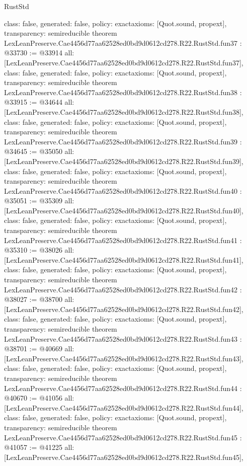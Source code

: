 \begin{lexlean}{RustStd}
\begin{coremodule}
{  class: false,
  generated: false,
  policy: exact{axioms: [Quot.sound, propext]},
  transparency: semireducible
}
theorem LexLeanPreserve.Cae4456d77aa62528ed0bd9d0612cd278.R22.RustStd.fun37 : @33730 := @33914 {
  all: [LexLeanPreserve.Cae4456d77aa62528ed0bd9d0612cd278.R22.RustStd.fun37],
  class: false,
  generated: false,
  policy: exact{axioms: [Quot.sound, propext]},
  transparency: semireducible
}
theorem LexLeanPreserve.Cae4456d77aa62528ed0bd9d0612cd278.R22.RustStd.fun38 : @33915 := @34644 {
  all: [LexLeanPreserve.Cae4456d77aa62528ed0bd9d0612cd278.R22.RustStd.fun38],
  class: false,
  generated: false,
  policy: exact{axioms: [Quot.sound, propext]},
  transparency: semireducible
}
theorem LexLeanPreserve.Cae4456d77aa62528ed0bd9d0612cd278.R22.RustStd.fun39 : @34645 := @35050 {
  all: [LexLeanPreserve.Cae4456d77aa62528ed0bd9d0612cd278.R22.RustStd.fun39],
  class: false,
  generated: false,
  policy: exact{axioms: [Quot.sound, propext]},
  transparency: semireducible
}
theorem LexLeanPreserve.Cae4456d77aa62528ed0bd9d0612cd278.R22.RustStd.fun40 : @35051 := @35309 {
  all: [LexLeanPreserve.Cae4456d77aa62528ed0bd9d0612cd278.R22.RustStd.fun40],
  class: false,
  generated: false,
  policy: exact{axioms: [Quot.sound, propext]},
  transparency: semireducible
}
theorem LexLeanPreserve.Cae4456d77aa62528ed0bd9d0612cd278.R22.RustStd.fun41 : @35310 := @38026 {
  all: [LexLeanPreserve.Cae4456d77aa62528ed0bd9d0612cd278.R22.RustStd.fun41],
  class: false,
  generated: false,
  policy: exact{axioms: [Quot.sound, propext]},
  transparency: semireducible
}
theorem LexLeanPreserve.Cae4456d77aa62528ed0bd9d0612cd278.R22.RustStd.fun42 : @38027 := @38700 {
  all: [LexLeanPreserve.Cae4456d77aa62528ed0bd9d0612cd278.R22.RustStd.fun42],
  class: false,
  generated: false,
  policy: exact{axioms: [Quot.sound, propext]},
  transparency: semireducible
}
theorem LexLeanPreserve.Cae4456d77aa62528ed0bd9d0612cd278.R22.RustStd.fun43 : @38701 := @40669 {
  all: [LexLeanPreserve.Cae4456d77aa62528ed0bd9d0612cd278.R22.RustStd.fun43],
  class: false,
  generated: false,
  policy: exact{axioms: [Quot.sound, propext]},
  transparency: semireducible
}
theorem LexLeanPreserve.Cae4456d77aa62528ed0bd9d0612cd278.R22.RustStd.fun44 : @40670 := @41056 {
  all: [LexLeanPreserve.Cae4456d77aa62528ed0bd9d0612cd278.R22.RustStd.fun44],
  class: false,
  generated: false,
  policy: exact{axioms: [Quot.sound, propext]},
  transparency: semireducible
}
theorem LexLeanPreserve.Cae4456d77aa62528ed0bd9d0612cd278.R22.RustStd.fun45 : @41057 := @41225 {
  all: [LexLeanPreserve.Cae4456d77aa62528ed0bd9d0612cd278.R22.RustStd.fun45],
}
\end{coremodule}
\end{lexlean}
